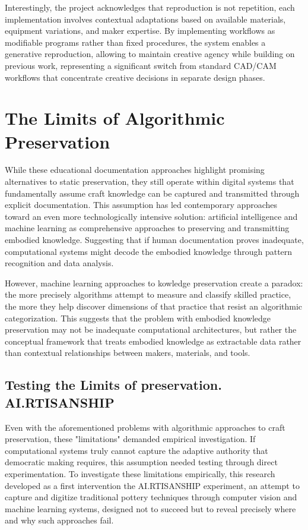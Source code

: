 Interestingly, the project acknowledges that reproduction is not repetition, each implementation involves contextual adaptations based on available materials, equipment variations, and maker expertise. By implementing workflows as modifiable programs rather than fixed procedures, the system enables a generative reproduction, allowing to maintain creative agency while building on previous work, representing a significant switch from standard CAD/CAM workflows that concentrate creative decisions in separate design phases.

\section{The Limits of Algorithmic Preservation}

While these educational documentation approaches highlight promising alternatives to static preservation, they still operate within digital systems that fundamentally assume craft knowledge can be captured and transmitted through explicit documentation. This assumption has led contemporary approaches toward an even more technologically intensive solution: artificial intelligence and machine learning as comprehensive approaches to preserving and transmitting embodied knowledge. Suggesting that if human documentation proves inadequate, computational systems might decode the embodied knowledge through pattern recognition and data analysis.
\vspace{0.5cm}

However, machine learning approaches to kowledge preservation create a paradox: the more precisely algorithms attempt to measure and classify skilled practice, the more they help discover dimensions of that practice that resist an algorithmic categorization. This suggests that the problem with embodied knowledge preservation may not be inadequate computational architectures, but rather the conceptual framework that treats embodied knowledge as extractable data rather than contextual relationships between makers, materials, and tools.

\subsection{Testing the Limits of preservation. AI.RTISANSHIP}

Even with the aforementioned problems with algorithmic approaches to craft preservation, these "limitations" demanded empirical investigation. If computational systems truly cannot capture the adaptive authority that democratic making requires, this assumption needed testing through direct experimentation. To investigate these limitations empirically, this research developed as a first intervention the AI.RTISANSHIP experiment, an attempt to capture and digitize traditional pottery techniques through computer vision and machine learning systems, designed not to succeed but to reveal precisely where and why such approaches fail.

